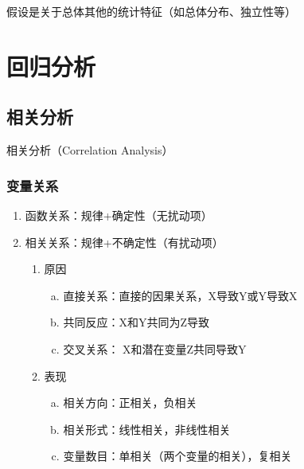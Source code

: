\documentclass[12pt]{book}
\begin{document}
假设是关于总体其他的统计特征（如总体分布、独立性等）






\section{回归分析}


\subsection{相关分析}



相关分析（Correlation Analysis）


\subsubsection{变量关系}

\begin{enumerate}[1.]
    \item 函数关系：规律+确定性（无扰动项）  
    \item 相关关系：规律+不确定性（有扰动项）  
    \begin{enumerate}[(1)]
        \item 原因  
        \begin{enumerate}[a.]
            \item 直接关系：直接的因果关系，X导致Y或Y导致X  
            \item 共同反应：X和Y共同为Z导致  
            \item 交叉关系： X和潜在变量Z共同导致Y  
        \end{enumerate}
        \item 表现  
        \begin{enumerate}[a.]
            \item 相关方向：正相关，负相关   
            \item 相关形式：线性相关，非线性相关  
            \item 变量数目：单相关（两个变量的相关），复相关  
        \end{enumerate}
    \end{enumerate}
\end{enumerate}
\end{document}
